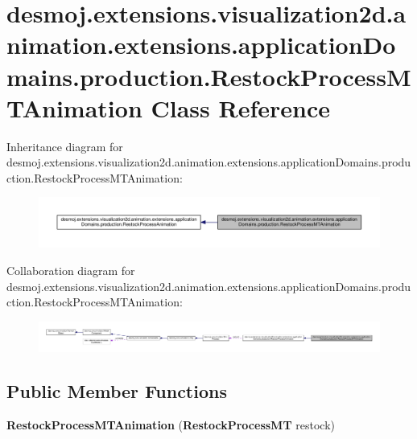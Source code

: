 \section{desmoj.\-extensions.\-visualization2d.\-animation.\-extensions.\-application\-Domains.\-production.\-Restock\-Process\-M\-T\-Animation Class Reference}
\label{classdesmoj_1_1extensions_1_1visualization2d_1_1animation_1_1extensions_1_1application_domains_1dc839a3d01d7f29a12cc832deb7dface}


Inheritance diagram for desmoj.\-extensions.\-visualization2d.\-animation.\-extensions.\-application\-Domains.\-production.\-Restock\-Process\-M\-T\-Animation\-:
\nopagebreak
\begin{figure}[H]
\begin{center}
\leavevmode
\includegraphics[width=350pt]{classdesmoj_1_1extensions_1_1visualization2d_1_1animation_1_1extensions_1_1application_domains_12ba45c818ea6b3c2b192520f29fc6275}
\end{center}
\end{figure}


Collaboration diagram for desmoj.\-extensions.\-visualization2d.\-animation.\-extensions.\-application\-Domains.\-production.\-Restock\-Process\-M\-T\-Animation\-:
\nopagebreak
\begin{figure}[H]
\begin{center}
\leavevmode
\includegraphics[width=350pt]{classdesmoj_1_1extensions_1_1visualization2d_1_1animation_1_1extensions_1_1application_domains_1df5d129259483da08a94f4d74afbc6a7}
\end{center}
\end{figure}
\subsection*{Public Member Functions}
\begin{DoxyCompactItemize}
\item 
{\bfseries Restock\-Process\-M\-T\-Animation} ({\bf Restock\-Process\-M\-T} restock)\label{classdesmoj_1_1extensions_1_1visualization2d_1_1animation_1_1extensions_1_1application_domains_1dc839a3d01d7f29a12cc832deb7dface_ae36bb99d3d1e79509cd45336eded088e}

\end{DoxyCompactItemize}
